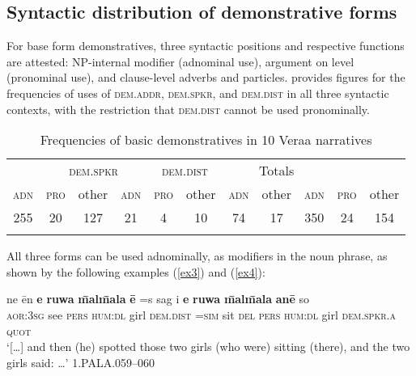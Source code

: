 \documentclass[output=paper
,modfonts
,nonflat]{langsci/langscibook}
\begin{document}
\subsection{Syntactic distribution of demonstrative forms} \label{sec:demvrasyntdistr}
For base form demonstratives, three syntactic positions and respective functions are attested: NP-internal modifier (adnominal use), argument on  level (pronominal use), and clause-level adverbs and particles.  provides figures for the frequencies of uses of \textsc{dem.addr}, \textsc{dem.spkr}, and \textsc{dem.dist} in all three syntactic contexts, with the restriction that \textsc{dem.dist} cannot be used pronominally.


\begin{table}
\caption{Frequencies of basic demonstratives in 10 Vera{\textquotesingle}a narratives}
\label{tab:demvrasyntdistr}
 \begin{tabular}{ccccccccccc} 
  \lsptoprule
   \multicolumn{3}{c}{\textsc{dem.addr}}   &  \multicolumn{3}{c}{\textsc{dem.spkr}}		&	\multicolumn{2}{c}{\textsc{dem.dist}}		&	\multicolumn{3}{c}{{Totals}}	\\\cmidrule(lr){1-3} \cmidrule(lr){4-6}\cmidrule(lr){7-8}\cmidrule(lr){9-11}
	 \textsc{adn}	&	 \textsc{pro}	&	 other	&	 \textsc{adn}	&	 \textsc{pro}	&	 other	&	 \textsc{adn}	&	 other	&	 \textsc{adn}	&	 \textsc{pro}	&	 other \\
 \midrule
  255 &	20	&	127	&	21	&	4	&	10	&	74	&	17	&	350	&	24	&	154 	\\
  \lspbottomrule
 \end{tabular}
\end{table}



All three forms can be used adnominally, as modifiers in the noun phrase, as shown by the following examples (\ref{ex3}) and (\ref{ex4}):

\ea \label{ex3}
\gll		ne				{\textquotesingle}\=en	\textbf{e}		\textbf{ruwa}	\textbf{\=mal\=mala}	\textbf{\=e}		=s 		sag	{\textquotesingle}i		\textbf{e}		\textbf{ruwa} 	\textbf{\=mal\=mala}	\textbf{an\=e}		so	\\
\textsc{aor:3sg}	see		\textsc{pers}	\textsc{hum:dl}	girl		\textsc{dem.dist}	\textsc{=sim}	sit	\textsc{del}	\textsc{pers} 	\textsc{hum:dl}	girl		\textsc{\textsc{dem.spkr.a}}		\textsc{quot}	\\
\glt	`[\dots] and then (he) spotted those two girls (who were) sitting (there), and the two girls said: \dots'		\hfill{1.PALA.059--060}
\z
\end{document}
